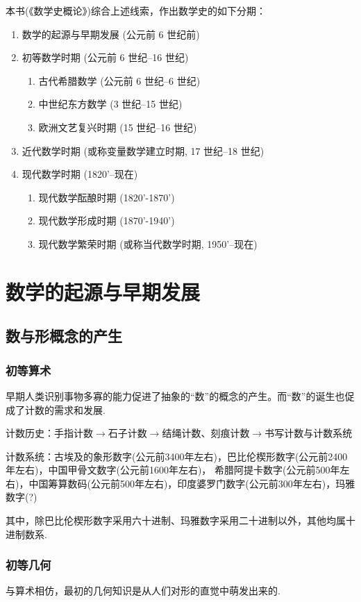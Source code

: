 \documentclass{Math_Note}
\begin{document}
本书(《数学史概论》)综合上述线索，作出数学史的如下分期：
\begin{enumerate}
    \item 数学的起源与早期发展 (公元前 6 世纪前)
    \item 初等数学时期 (公元前 6 世纪–16 世纪)
    \begin{enumerate}
        \item 古代希腊数学 (公元前 6 世纪–6 世纪)
        \item 中世纪东方数学 (3 世纪–15 世纪)
        \item 欧洲文艺复兴时期 (15 世纪–16 世纪)
    \end{enumerate}
    \item 近代数学时期 (或称变量数学建立时期, 17 世纪–18 世纪)
    \item 现代数学时期 (1820'–现在)
    \begin{enumerate}
        \item 现代数学酝酿时期 (1820'-1870')
        \item 现代数学形成时期 (1870'-1940')
        \item 现代数学繁荣时期 (或称当代数学时期, 1950'–现在)
    \end{enumerate}
\end{enumerate}

\section{数学的起源与早期发展}
\subsection{数与形概念的产生}
\subsubsection{初等算术}
早期人类识别事物多寡的能力促进了抽象的“数”的概念的产生。而“数”的诞生也促成了计数的需求和发展.

计数历史：手指计数$\rightarrow$石子计数$\rightarrow$结绳计数、刻痕计数$\rightarrow$书写计数与计数系统

计数系统：古埃及的象形数字(公元前3400年左右)，巴比伦楔形数字(公元前2400年左右)，中国甲骨文数字(公元前1600年左右)，
希腊阿提卡数字(公元前500年左右)，中国筹算数码(公元前500年左右)，印度婆罗门数字(公元前300年左右)，玛雅数字(?)

其中，除巴比伦楔形数字采用六十进制、玛雅数字采用二十进制以外，其他均属十进制数系.

\subsubsection{初等几何}
与算术相仿，最初的几何知识是从人们对形的直觉中萌发出来的.
\end{document}

